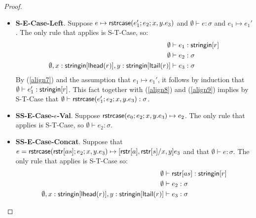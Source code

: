 \documentclass[11pt,leqno]{article}
\theoremstyle{definition}
\newcommand{\stringin}[1]{{\sf stringin}[#1]}
\newcommand{\strcase}[3]{ {\sf rstrcase}(#1; #2; #3)}
\newcommand{\lhead}[1]{ {\sf lhead}(#1) }
\newcommand{\ltail}[1]{ {\sf ltail}(#1) }
\begin{document}
\begin{proof}
\begin{itemize}[label=$ $,itemsep=1ex]
\item \textbf{S-E-Case-Left}.
Suppose 
$e \mapsto \strcase{e_1'}{e_2}{x,y.e_3}$
and $\emptyset \vdash e : \sigma$ and $e_1 \mapsto e_1'$.
The only rule that applies is S-T-Case, so:
\begin{align}
\emptyset&\vdash e_1 : \stringin{r} \label{align7} \\
\emptyset&\vdash e_2 : \sigma \label{align8} \\ 
\emptyset, x:\stringin{\lhead{r}}, y : \stringin{\ltail{r}} &\vdash e_3 : \sigma \label{align9}
\end{align}
By (\ref{align7}) and the assumption that $e_1 \mapsto e_1'$, it follows by induction that $\emptyset\vdash e_1' : \stringin{r}$.
This fact together with (\ref{align8}) and (\ref{align9}) implies by S-T-Case that
$\emptyset\vdash\strcase{e_1'}{e_2}{x,y.e_3} : \sigma$.


\item \textbf{SS-E-Case-$\epsilon$-Val}.
Suppose $\strcase{e_0}{e_2}{x,y.e_3} \mapsto e_2$. 
The only rule that applies is S-T-Case, so $\emptyset \vdash e_2 : \sigma$. 

\item \textbf{SS-E-Case-Concat}.
Suppose that $e = \strcase{\rstr{as}}{e_2}{x,y.e_3} \mapsto [\rstr{a}, \rstr{s} / x,y] e_3$
and that $\emptyset\vdash e : \sigma$.
The only rule that applies is S-T-Case so:
\begin{align}
\emptyset&\vdash \rstr{as} : \stringin{r} \label{align13}\\
\emptyset&\vdash e_2 : \sigma \label{align14} \\ 
\emptyset, x:\stringin{\lhead{r}}, y : \stringin{\ltail{r}} &\vdash e_3 : \sigma \label{align15}
\end{align}


\end{itemize}
\end{proof}
\end{document}
